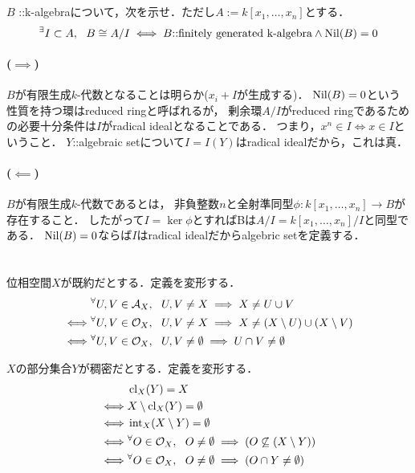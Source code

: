 \documentclass[a4paper]{jarticle}
\begin{document}
\section{}
    \begin{screen}
        $B$ ::k-algebraについて，次を示せ．ただし$A:=k[x_1, \dots, x_n]$とする．
        \[ {}^{\exists} I \subset A,~~ B \cong A/I \iff B \mbox{::finitely generated k-algebra} \land \operatorname{Nil}(B)=0 \]
    \end{screen}
    \paragraph{($\implies$)}
    $B$が有限生成$k$-代数となることは明らか($x_i+I$が生成する)．
    $\operatorname{Nil}(B)=0$という性質を持つ環はreduced ringと呼ばれるが，
    剰余環$A/I$がreduced ringであるための必要十分条件は$I$がradical idealとなることである．
    つまり，$x^n \in I \iff x \in I$ということ．
    $Y$::algebraic setについて$I=I(Y)$はradical idealだから，これは真．

    \paragraph{($\impliedby$)}
    $B$が有限生成$k$-代数であるとは，
    非負整数$n$と全射準同型$\phi: k[x_1, \dots, x_n] \to B$が存在すること．
    したがって$I=\ker \phi$とすればBは$A/I=k[x_1, \dots, x_n]/I$と同型である．
    $\operatorname{Nil}(B)=0$ならば$I$はradical idealだからalgebric setを定義する．

\section{}
    位相空間$X$が既約だとする．定義を変形する．
    \begin{align*}
        {}&     {}^{\forall} U, V \in \mathcal{A}_{X},~~ U,V \neq X \implies X \neq U \cup V \\
        \iff&   {}^{\forall} U,V \in \mathcal{O}_{X},~~ U,V \neq X \implies X \neq (X \setminus U) \cup (X \setminus V) \\
        \iff&   {}^{\forall} U,V \in \mathcal{O}_{X},~~ U,V \neq \emptyset \implies U \cap V \neq \emptyset
    \end{align*}

    $X$の部分集合$Y$が稠密だとする．定義を変形する．
    \begin{align*}
        {}&     \operatorname{cl}_{X}(Y)=X \\
        \iff&   X \setminus \operatorname{cl}_{X}(Y)=\emptyset \\
        \iff&   \operatorname{int}_{X}(X \setminus Y)=\emptyset \\
        \iff&   {}^{\forall} O \in \mathcal{O}_{X},~~ O \neq \emptyset \implies (O \not \subseteq (X \setminus Y)) \\
        \iff&   {}^{\forall} O \in \mathcal{O}_{X},~~ O \neq \emptyset \implies (O \cap Y \neq \emptyset)
    \end{align*}
\end{document}
